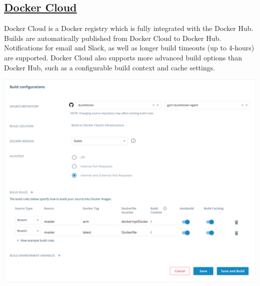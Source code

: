 \documentclass[12pt,initial,twoside,maitrise]{dms}
\numberwithin{equation}{section}
\numberwithin{table}{chapter}
\numberwithin{figure}{chapter}
\begin{document}
\subsection{\href{https://cloud.docker.com/}{Docker Cloud}}

Docker Cloud is a Docker registry which is fully integrated with the Docker Hub. Builds are automatically published from Docker Cloud to Docker Hub. Notifications for email and Slack, as well as longer build timeouts (up to 4-hours) are supported. Docker Cloud also supports more advanced build options than Docker Hub, such as a configurable build context and cache settings.\\

\begin{centering}
\includegraphics[width=\textwidth]{../figures/docker_cloud.png}
\end{centering}
\end{document}
